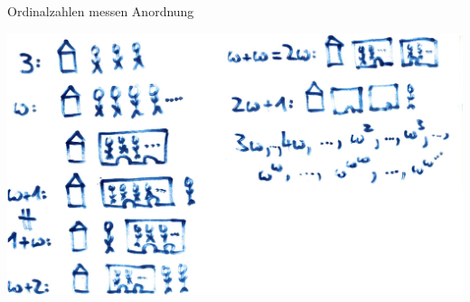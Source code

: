 \documentclass[12pt,compress,ngerman,utf8,t]{beamer}
\renewcommand{\_}{\mathpunct{.}\,}
\begin{document}
\begin{frame}{Ordinalzahlen messen Anordnung}
  \begin{center}
    \includegraphics[width=\textwidth]{images/ordinal-intuition}
  \end{center}
\end{frame}

\end{document}
